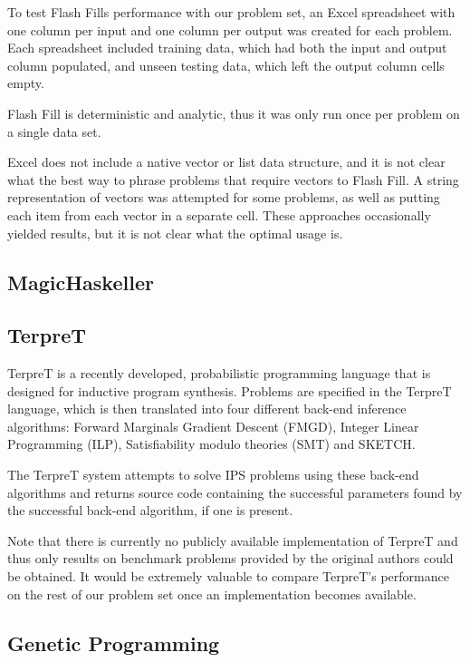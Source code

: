To test Flash Fills performance with our problem set, an Excel spreadsheet with one column per input and one column per output was created for each problem. Each spreadsheet included training data, which had both the input and output column populated, and unseen testing data, which left the output column cells empty.

Flash Fill is deterministic and analytic, thus it was only run once per problem on a single data set.

Excel does not include a native vector or list data structure, and it is not clear what the best way to phrase problems that require vectors to Flash Fill. A string representation of vectors was attempted for some problems, as well as putting each item from each vector in a separate cell. These approaches occasionally yielded results, but it is not clear what the optimal usage is.

\subsection{MagicHaskeller}


\subsection{TerpreT}

TerpreT is a recently developed, probabilistic programming language that is designed for inductive program synthesis. Problems are specified in the TerpreT language, which is then translated into four different back-end inference algorithms: Forward Marginals Gradient Descent (FMGD), Integer Linear Programming (ILP), Satisfiability modulo theories (SMT) and SKETCH.

The TerpreT system attempts to solve IPS problems using these back-end algorithms and returns source code containing the successful parameters found by the successful back-end algorithm, if one is present.

Note that there is currently no publicly available implementation of TerpreT and thus only results on benchmark problems provided by the original authors could be obtained. It would be extremely valuable to compare TerpreT's performance on the rest of our problem set once an implementation becomes available.


\subsection{Genetic Programming}

